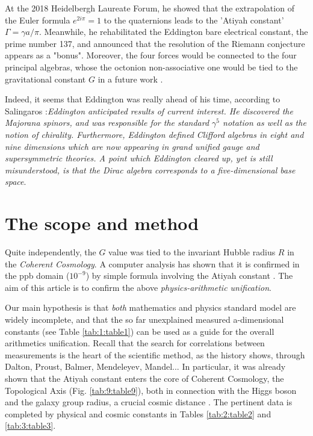\documentclass[a4paper,9pt]{article}
\begin{document}
    
    At the 2018 Heidelbergh Laureate Forum, he showed that the extrapolation of the Euler formula  $e^{2i\pi} = 1$ to the quaternions leads to the 'Atiyah constant' $\Gamma = \gamma a/\pi $. Meanwhile, he rehabilitated the Eddington \cite{Eddington} bare electrical constant, the prime number 137, and announced that the resolution of the Riemann conjecture appears as a "bonus". Moreover, the four forces would be connected to the four principal algebras, whose the octonion non-associative one would be tied to the gravitational constant $G$ in a future work \cite{Atiyah}. 
    
    
Indeed, it seems that Eddington was really ahead of his time, according to Salingaros \cite {Salingaros} :\textit{Eddington anticipated results of current interest. He discovered the Majorana spinors, and was responsible for the standard $\gamma^5$ notation as well as the notion of chirality. Furthermore, Eddington defined Clifford algebras in eight and nine dimensions which are now appearing in grand unified gauge and supersymmetric theories. A point which Eddington cleared up, yet is still misunderstood, is that the Dirac algebra corresponds to a five-dimensional base space}.


       






\section{The scope and method}
   Quite independently, the $G$ value was tied to the invariant Hubble radius $R$ in the \textit {Coherent Cosmology}. A computer analysis has shown that it is confirmed in the ppb domain ($10^{-9}$) by simple formula involving the Atiyah constant \cite{Sanchez}. The aim of this article is to confirm the above \textit {physics-arithmetic unification}.
   
   Our main hypothesis is that \textit{both} mathematics and physics standard model are widely incomplete, and that the so far unexplained measured a-dimensional constants (see Table \ref{tab:1:table1}) can be used as a guide for the overall arithmetics unification. Recall that the search for correlations between measurements is the heart of the scientific method, as the history shows, through Dalton, Proust, Balmer, Mendeleyev, Mandel... In particular, it was already shown that the Atiyah constant enters the core of Coherent Cosmology, the Topological Axis (Fig. \ref{tab:9:table9}), both in connection with the Higgs boson and the galaxy group radius, a crucial cosmic distance \cite{Sanchez}. The pertinent data is completed by physical and cosmic constants in Tables \ref{tab:2:table2} and \ref{tab:3:table3}.
   
\end{document}

